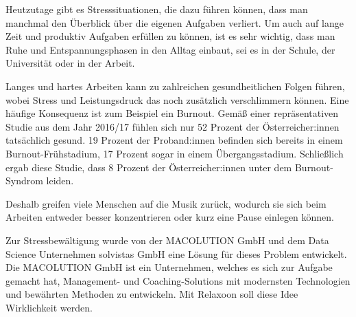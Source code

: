 
Heutzutage gibt es Stresssituationen, die dazu führen können, dass man manchmal den Überblick über die 
eigenen Aufgaben verliert. Um auch auf lange Zeit und produktiv Aufgaben erfüllen zu können, ist es sehr 
wichtig, dass man Ruhe und Entspannungsphasen in den Alltag einbaut, sei es in der Schule, der Universität
oder in der Arbeit. 

Langes und hartes Arbeiten kann zu zahlreichen gesundheitlichen Folgen führen, wobei Stress und 
Leistungsdruck das noch zusätzlich verschlimmern können. Eine häufige Konsequenz ist zum Beispiel
ein Burnout. Gemäß einer repräsentativen Studie \cite{burnout} aus dem Jahr 2016/17 fühlen sich nur 52 Prozent der 
Österreicher:innen tatsächlich gesund. 19 Prozent der Proband:innen befinden sich bereits in einem 
Burnout-Frühstadium, 17 Prozent sogar in einem Übergangsstadium. Schließlich ergab diese Studie, dass 
8 Prozent der Österreicher:innen unter dem Burnout-Syndrom leiden. 

Deshalb greifen viele Menschen
auf die Musik zurück, wodurch sie sich beim Arbeiten entweder besser konzentrieren oder kurz
eine Pause einlegen können.

Zur Stressbewältigung wurde von der MACOLUTION GmbH und dem Data Science Unternehmen solvistas GmbH
eine Lösung für dieses Problem entwickelt. 
Die MACOLUTION GmbH ist ein Unternehmen, welches es sich zur Aufgabe gemacht hat,
Management- und Coaching-Solutions mit modernsten Technologien und bewährten Methoden zu entwickeln.
\cite{MACOLUTION}
Mit Relaxoon soll diese Idee Wirklichkeit werden.

